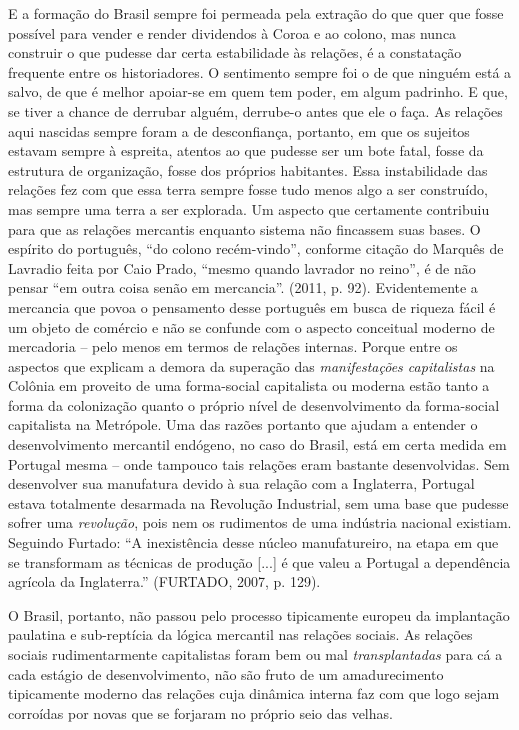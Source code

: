 E a formação do Brasil sempre foi permeada pela extração do que quer que
fosse possível para vender e render dividendos à Coroa e ao colono, mas
nunca construir o que pudesse dar certa estabilidade às relações, é a
constatação frequente entre os historiadores. O sentimento sempre foi o
de que ninguém está a salvo, de que é melhor apoiar-se em quem tem
poder, em algum padrinho. E que, se tiver a chance de derrubar alguém,
derrube-o antes que ele o faça. As relações aqui nascidas sempre foram a
de desconfiança, portanto, em que os sujeitos estavam sempre à espreita,
atentos ao que pudesse ser um bote fatal, fosse da estrutura de
organização, fosse dos próprios habitantes. Essa instabilidade das
relações fez com que essa terra sempre fosse tudo menos algo a ser
construído, mas sempre uma terra a ser explorada. Um aspecto que
certamente contribuiu para que as relações mercantis enquanto sistema
não fincassem suas bases. O espírito do português, ``do colono
recém-vindo'', conforme citação do Marquês de Lavradio feita por Caio
Prado, ``mesmo quando lavrador no reino'', é de não pensar ``em outra
coisa senão em mercancia''. (2011, p. 92). Evidentemente a mercancia que
povoa o pensamento desse português em busca de riqueza fácil é um objeto
de comércio e não se confunde com o aspecto conceitual moderno de
mercadoria -- pelo menos em termos de relações internas. Porque entre os
aspectos que explicam a demora da superação das \emph{manifestações
capitalistas} na Colônia em proveito de uma forma-social capitalista ou
moderna estão tanto a forma da colonização quanto o próprio nível de
desenvolvimento da forma-social capitalista na Metrópole. Uma das razões
portanto que ajudam a entender o desenvolvimento mercantil endógeno, no
caso do Brasil, está em certa medida em Portugal mesma -- onde tampouco
tais relações eram bastante desenvolvidas. Sem desenvolver sua
manufatura devido à sua relação com a Inglaterra, Portugal estava
totalmente desarmada na Revolução Industrial, sem uma base que pudesse
sofrer uma \emph{revolução}, pois nem os rudimentos de uma indústria
nacional existiam. Seguindo Furtado: ``A inexistência desse núcleo
manufatureiro, na etapa em que se transformam as técnicas de produção
{[}...{]} é que valeu a Portugal a dependência agrícola da Inglaterra.''
(FURTADO, 2007, p. 129).

O Brasil, portanto, não passou pelo processo tipicamente europeu da
implantação paulatina e sub-reptícia da lógica mercantil nas relações
sociais. As relações sociais rudimentarmente capitalistas foram bem ou
mal \emph{transplantadas} para cá a cada estágio de desenvolvimento, não
são fruto de um amadurecimento tipicamente moderno das relações cuja
dinâmica interna faz com que logo sejam corroídas por novas que se
forjaram no próprio seio das velhas.

